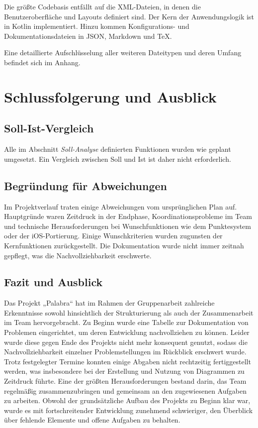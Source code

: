 \documentclass[12pt,a4paper]{article}
\begin{document}
Die größte Codebasis entfällt auf die XML-Dateien, in denen die Benutzeroberfläche und Layouts definiert sind. Der Kern der Anwendungslogik ist in Kotlin implementiert. Hinzu kommen Konfigurations- und Dokumentationsdateien in JSON, Markdown und TeX.

Eine detaillierte Aufschlüsselung aller weiteren Dateitypen und deren Umfang befindet sich im Anhang.

\section{Schlussfolgerung und Ausblick}

\subsection{Soll-Ist-Vergleich}
Alle im Abschnitt \textit{Soll-Analyse} definierten Funktionen wurden wie geplant umgesetzt. Ein Vergleich zwischen Soll und Ist ist daher nicht erforderlich.

\subsection{Begründung für Abweichungen}
Im Projektverlauf traten einige Abweichungen vom ursprünglichen Plan auf. Hauptgründe waren Zeitdruck in der Endphase, Koordinationsprobleme im Team und technische Herausforderungen bei Wunschfunktionen wie dem Punktesystem oder der iOS-Portierung. Einige Wunschkriterien wurden zugunsten der Kernfunktionen zurückgestellt. Die Dokumentation wurde nicht immer zeitnah gepflegt, was die Nachvollziehbarkeit erschwerte.

\subsection{Fazit und Ausblick}
Das Projekt „Palabra“ hat im Rahmen der Gruppenarbeit zahlreiche Erkenntnisse sowohl hinsichtlich der Strukturierung als auch der Zusammenarbeit im Team hervorgebracht. Zu Beginn wurde eine Tabelle zur Dokumentation von Problemen eingerichtet, um deren Entwicklung nachvollziehen zu können. Leider wurde diese gegen Ende des Projekts nicht mehr konsequent genutzt, sodass die Nachvollziehbarkeit einzelner Problemstellungen im Rückblick erschwert wurde. Trotz festgelegter Termine konnten einige Abgaben nicht rechtzeitig fertiggestellt werden, was insbesondere bei der Erstellung und Nutzung von Diagrammen zu Zeitdruck führte. Eine der größten Herausforderungen bestand darin, das Team regelmäßig zusammenzubringen und gemeinsam an den zugewiesenen Aufgaben zu arbeiten. Obwohl der grundsätzliche Aufbau des Projekts zu Beginn klar war, wurde es mit fortschreitender Entwicklung zunehmend schwieriger, den Überblick über fehlende Elemente und offene Aufgaben zu behalten.
\end{document}
